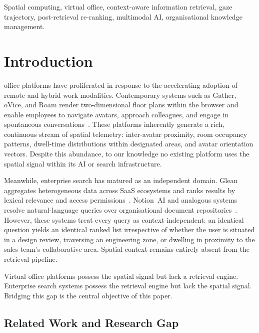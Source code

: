\documentclass[journal]{IEEEtran}
\begin{document}
\begin{IEEEkeywords}
Spatial computing, virtual office, context-aware information retrieval,
gaze trajectory, post-retrieval re-ranking, multimodal AI,
organisational knowledge management.
\end{IEEEkeywords}

\section{Introduction}
\label{sec:introduction}

 office platforms have proliferated in response
to the accelerating adoption of remote and hybrid work modalities.
Contemporary systems such as Gather, oVice, and
Roam render two-dimensional floor plans within the browser and enable
employees to navigate avatars, approach colleagues, and engage in
spontaneous conversations~\cite{gather, ovice, roam}.  These platforms inherently generate a rich,
continuous stream of spatial telemetry: inter-avatar proximity, room
occupancy patterns, dwell-time distributions within designated areas,
and avatar orientation vectors.  Despite this abundance, to our knowledge no existing platform uses
the spatial signal within its AI or search infrastructure.

Meanwhile, enterprise search has matured as an independent domain.
Glean aggregates heterogeneous data across SaaS ecosystems and ranks
results by lexical relevance and access
permissions~\cite{glean}.  Notion~AI and analogous systems
resolve natural-language queries over organisational document
repositories~\cite{notionai}.  However, these systems
treat every query as context-independent: an identical question yields
an identical ranked list irrespective of whether the user is situated
in a design review, traversing an engineering zone, or dwelling in
proximity to the sales team's collaborative area.  Spatial context
remains entirely absent from the retrieval pipeline.

Virtual office platforms possess the spatial signal but lack a
retrieval engine.  Enterprise search systems possess the retrieval
engine but lack the spatial signal.  Bridging this gap is the central
objective of this paper.

\subsection{Related Work and Research Gap}
\label{sec:intro_gap}
\end{document}
